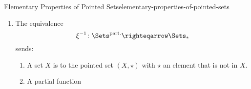 \begin{proposition}{Elementary Properties of Pointed Sets}{elementary-properties-of-pointed-sets}
\begin{enumerate}
\begin{enumerate}
\[                        \colon%
                        \Sets_{*}%
                        \righteqarrow%
                        \Sets^{\mathrm{part.}}%
                    \]%
                    sends:
                    \begin{enumerate}
                        \item\label{elementary-properties-of-pointed-sets-relation-to-partial-functions-a-i}A pointed set $(X,x_{0})$ to $X$.
                        \item\label{elementary-properties-of-pointed-sets-relation-to-partial-functions-a-ii}A pointed function
                            \[
                                f%
                                \colon%
                                (X,x_{0})%
                                \to%
                                (Y,y_{0})%
                            \]%
                             to the partial function
                            \[
                                \xi_{f}%
                                \colon%
                                X%
                                \to%
                                Y%
                            \]%
                            defined on $f^{-1}(Y\setminus y_{0})$ and given by
                            \[
                                \xi_{f}(x)%
                                \defeq%
                                f(x)%
                            \]%
                            for each $x\in f^{-1}(Y\setminus y_{0})$.
                    \end{enumerate}
                \item\label{elementary-properties-of-pointed-sets-relation-to-partial-functions-b}The equivalence
                    \[
                        \xi^{-1}%
                        \colon%
                        \Sets^{\mathrm{part.}}%
                        \righteqarrow%
                        \Sets_{*}%
                    \]%
                    sends:
                    \begin{enumerate}
                        \item\label{elementary-properties-of-pointed-sets-relation-to-partial-functions-b-i}A set $X$ is to the pointed set $(X,\star)$ with $\star$ an element that is not in $X$.
                        \item\label{elementary-properties-of-pointed-sets-relation-to-partial-functions-b-ii}A partial function
                            \[
\]
\end{enumerate}
\end{enumerate}
\end{enumerate}
\end{proposition}
